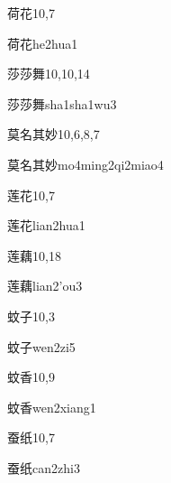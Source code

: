 \begin{entry}{荷花}{10,7}
  \begin{phonetics}{荷花}{he2hua1}
  \end{phonetics}
\end{entry}

\begin{entry}{莎莎舞}{10,10,14}
  \begin{phonetics}{莎莎舞}{sha1sha1wu3}
  \end{phonetics}
\end{entry}

\begin{entry}{莫名其妙}{10,6,8,7}
  \begin{phonetics}{莫名其妙}{mo4ming2qi2miao4}
  \end{phonetics}
\end{entry}

\begin{entry}{莲花}{10,7}
  \begin{phonetics}{莲花}{lian2hua1}
  \end{phonetics}
\end{entry}

\begin{entry}{莲藕}{10,18}
  \begin{phonetics}{莲藕}{lian2'ou3}
  \end{phonetics}
\end{entry}

\begin{entry}{蚊子}{10,3}
  \begin{phonetics}{蚊子}{wen2zi5}
  \end{phonetics}
\end{entry}

\begin{entry}{蚊香}{10,9}
  \begin{phonetics}{蚊香}{wen2xiang1}
  \end{phonetics}
\end{entry}

\begin{entry}{蚕纸}{10,7}
  \begin{phonetics}{蚕纸}{can2zhi3}
  \end{phonetics}
\end{entry}

